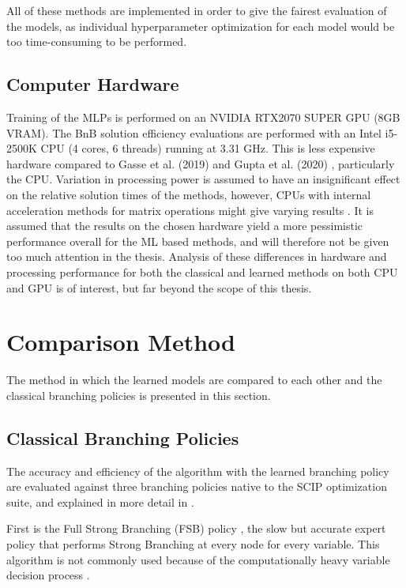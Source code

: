  All of these methods are implemented in order to give the fairest evaluation of the models, as individual hyperparameter optimization for each model would be too time-consuming to be performed. 


\subsection{Computer Hardware}

Training of the \gls{MLP}s is performed on an NVIDIA RTX2070 SUPER GPU (8GB VRAM). The \gls{BnB} solution efficiency evaluations are performed with an Intel i5-2500K \gls{CPU} (4 cores, 6 threads) running at 3.31 GHz. This is less expensive hardware compared to Gasse et al. (2019) \cite{gasse2019exact} and Gupta et al. (2020) \cite{gupta2020hybrid}, particularly the CPU. Variation in processing power is assumed to have an insignificant effect on the relative solution times of the methods, however, \gls{CPU}s with internal acceleration methods for matrix operations might give varying results \cite{vanhoucke2011improving}. It is assumed that the results on the chosen hardware yield a more pessimistic performance overall for the \gls{ML} based methods, and will therefore not be given too much attention in the thesis. Analysis of these differences in hardware and processing performance for both the classical and learned methods on both \gls{CPU} and \gls{GPU} is of interest, but far beyond the scope of this thesis. 



\section{Comparison Method}

The method in which the learned models are compared to each other and the classical branching policies is presented in this section.


\subsection{Classical Branching Policies}

The accuracy and efficiency of the algorithm with the learned branching policy are evaluated against three branching policies native to the \gls{SCIP} optimization suite, and explained in  more detail in . 

First is the Full Strong Branching (\gls{FSB}) policy \cite{applegate1995finding}, the slow but accurate expert policy that performs Strong Branching at every node for every variable. This algorithm is not commonly used because of the computationally heavy variable decision process \cite{achterberg2004branching}.

